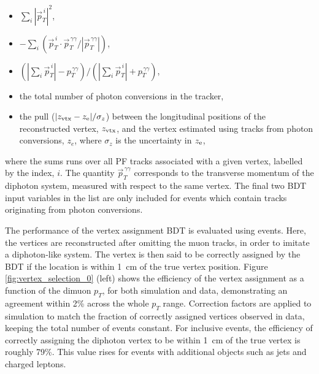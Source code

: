 \begin{itemize}
    \item $\sum_i |\vec{p}^{\,i}_T|^2$,
    \item $-\sum_i (\vec{p}^{\,i}_T\cdot \vec{p}_T^{\,\gamma\gamma}/|\vec{p}_T^{\,\gamma\gamma}|)$,
    \item $(|\sum_i \vec{p}^{\,i}_T| - p_T^{\,\gamma\gamma})/(|\sum_i \vec{p}^{\,i}_T| + p_T^{\,\gamma\gamma})$,
    \item the total number of photon conversions in the tracker,
    \item the pull ($|z_{\rm{vtx}}-z_{\rm{e}}|/\sigma_z$) between the longitudinal positions of the reconstructed vertex, $z_{\rm{vtx}}$, and the vertex estimated using tracks from photon conversions, $z_e$, where $\sigma_z$ is the uncertainty in $z_{\rm{e}}$,
\end{itemize}

\noindent
where the sums runs over all PF tracks associated with a given vertex, labelled by the index, $i$. The quantity $\vec{p}_T^{\,\gamma\gamma}$ corresponds to the transverse momentum of the diphoton system, measured with respect to the same vertex. The final two BDT input variables in the list are only included for events which contain tracks originating from photon conversions. 

The performance of the vertex assignment BDT is evaluated using \Zmumu events. Here, the vertices are reconstructed after omitting the muon tracks, in order to imitate a diphoton-like system. The vertex is then said to be correctly assigned by the BDT if the location is within 1~cm of the true vertex position. Figure \ref{fig:vertex_selection_0} (left) shows the efficiency of the vertex assignment as a function of the dimuon $p_T$, for both simulation and data, demonstrating an agreement within 2\% across the whole $p_T$ range. Correction factors are applied to simulation to match the fraction of correctly assigned vertices observed in data, keeping the total number of events constant. For inclusive \Hgg events, the efficiency of correctly assigning the diphoton vertex to be within 1~cm of the true vertex is roughly 79\%. This value rises for events with additional objects such as jets and charged leptons.

